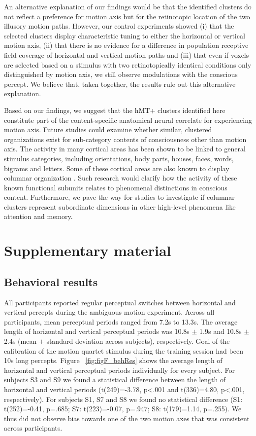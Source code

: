 An alternative explanation of our findings would be that the identified clusters do not reflect a preference for motion axis but for the retinotopic location of the two illusory motion paths. However, our control experiments showed (i) that the selected clusters display characteristic tuning to either the horizontal or vertical motion axis, (ii) that there is no evidence for a difference in population receptive field coverage of horizontal and vertical motion paths and (iii) that even if voxels are selected based on a stimulus with two retinotopically identical conditions only distinguished by motion axis, we still observe modulations with the conscious percept. We believe that, taken together, the results rule out this alternative explanation.

Based on our findings, we suggest that the hMT+ clusters identified here constitute part of the content-specific anatomical neural correlate for experiencing motion axis. Future studies could examine whether similar, clustered organizations exist for sub-category contents of consciousness other than motion axis. The activity in many cortical areas has been shown to be linked to general stimulus categories, including orientations, body parts, houses, faces, words, bigrams and letters. Some of these cortical areas are also known to display columnar organization \parencite{Tanaka2003}. Such research would clarify how the activity of these known functional subunits relates to phenomenal distinctions in conscious content. Furthermore, we pave the way for studies to investigate if columnar clusters represent subordinate dimensions in other high-level phenomena like attention and memory.

\clearpage
\section{Supplementary material}

\subsection{Behavioral results}
All participants reported regular perceptual switches between horizontal and vertical percepts during the ambiguous motion experiment. Across all participants, mean perceptual periods ranged from 7.2s to 13.3s. The average length of horizontal and vertical perceptual periods was 10.8s $\pm$ 1.9s and 10.8s $\pm$ 2.4s (mean $\pm$ standard deviation across subjects), respectively. Goal of the calibration of the motion quartet stimulus during the training session had been 10s long percepts. Figure ~\ref{fig:figF_behRes} shows the average length of horizontal and vertical perceptual periods individually for every subject. For subjects S3 and S9 we found a statistical difference between the length of horizontal and vertical periods (t(249)=-3.78, p\textless.001 and t(336)=4.80, p\textless.001, respectively). For subjects S1, S7 and S8 we found no statistical difference (S1: t(252)=-0.41, p=.685; S7: t(223)=-0.07, p=.947; S8: t(179)=1.14, p=.255). We thus did not observe bias towards one of the two motion axes that was consistent across participants.

